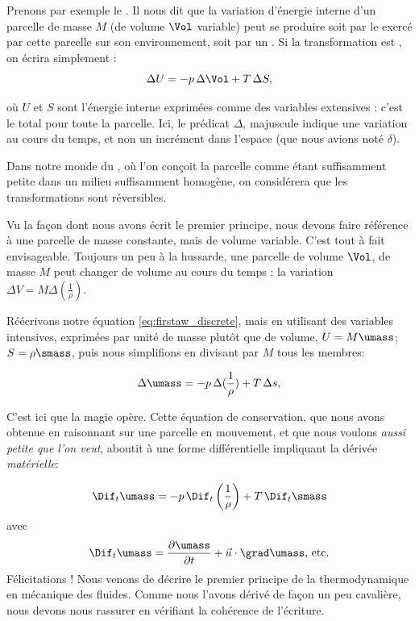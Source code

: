 Prenons par exemple le . Il nous dit que la variation d’énergie interne d’un parcelle de masse $M$ (de volume $\Vol$ variable) peut se produire soit par le  exercé par cette parcelle sur son environnement, soit par un . Si la transformation est , on écrira simplement :
\begin{equation}
\Delta U = - p \, \Delta \Vol + T \, \Delta S, 
\label{eq:firstaw_discrete}
\end{equation}

où $U$ et $S$ sont l'énergie interne exprimées comme des variables extensives : c'est le total pour toute la parcelle. 
Ici, le prédicat \(\Delta\), majuscule indique une variation au cours du temps, et non un incrément dans l’espace (que nous avions noté \(\delta\)).  

Dans notre monde du , où l’on conçoit la parcelle comme étant suffisamment petite dans un milieu suffisamment homogène, on considérera que les transformations sont réversibles. 

Vu la façon dont nous avons écrit le premier principe, nous devons faire référence à une parcelle de masse constante, mais de volume variable. C'est tout à fait envisageable. 
Toujours un peu à la hussarde, une parcelle de volume $\Vol$, de masse $M$ peut changer de volume au cours du temps : la variation $\Delta V = M \Delta (\frac{1}{\rho})$. 

Réécrivons notre équation \eqref{eq:firstaw_discrete}, mais en utilisant des variables intensives, exprimées par unité de masse plutôt que de volume, $U=M \umass$; $S=\rho\smass$, puis nous simplifions en divisant par $M$ tous les membres:

\begin{equation}
\Delta \umass = - p \, \Delta (\frac{1}{\rho}) + T \, \Delta s, 
\label{eq:firstaw_discrete2}
\end{equation}

C'est ici que la magie opère. Cette équation de conservation, que nous avons obtenue en raisonnant sur une parcelle en mouvement, et  que nous voulons \emph{aussi petite que l'on veut}, aboutit à une forme différentielle impliquant la dérivée \emph{matérielle}: 


\begin{equation}
\Dif_t \umass = - p \, \Dif_t \left(\frac{1}{\rho}\right) + T \, \Dif_t \smass
\label{eq:firstaw_continuous}
\end{equation}
avec
\begin{equation}
  \Dif_t \umass = \frac{\partial \umass}{\partial t} + \vec{u} \cdot \grad \umass\textrm{, etc.}
\label{eq:material_derivative_U}
\end{equation}
Félicitations ! Nous venons de décrire le premier principe de la thermodynamique en mécanique des fluides. Comme nous l’avons dérivé de façon un peu cavalière, nous devons nous rassurer en vérifiant la cohérence de l’écriture. 



